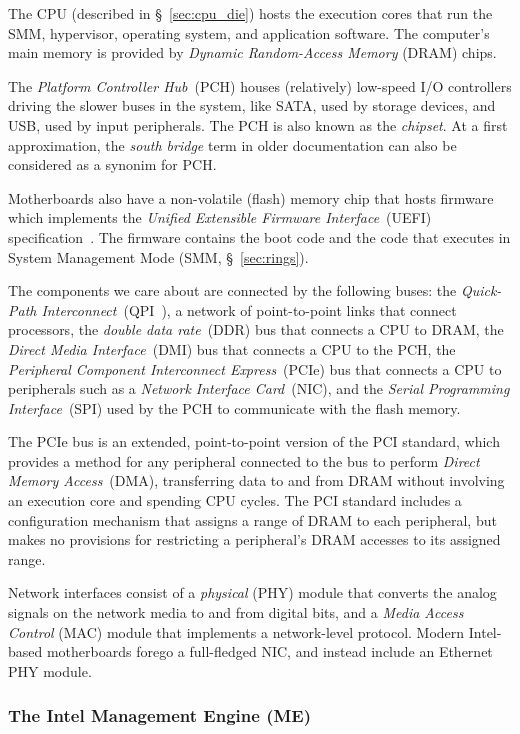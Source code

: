 The CPU (described in \S~\ref{sec:cpu_die}) hosts the execution cores that run
the SMM, hypervisor, operating system, and application software. The computer's
main memory is provided by \textit{Dynamic Random-Access Memory} (DRAM) chips.

The \textit{Platform Controller Hub}~(PCH) houses (relatively) low-speed I/O
controllers driving the slower buses in the system, like SATA, used by storage
devices, and USB, used by input peripherals. The PCH is also known as the
\textit{chipset}. At a first approximation, the \textit{south bridge} term in
older documentation can also be considered as a synonim for PCH.

Motherboards also have a non-volatile (flash) memory chip that hosts firmware
which implements the \textit{Unified Extensible Firmware Interface}~(UEFI)
specification~\cite{forum2015uefi}. The firmware contains the boot code and the
code that executes in System Management Mode (SMM, \S~\ref{sec:rings}).

The components we care about are connected by the following buses: the
\textit{Quick-Path Interconnect}~(QPI~\cite{intel2009qpi}), a network of
point-to-point links that connect processors, the
\textit{double data rate}~(DDR) bus that connects a CPU to DRAM, the
\textit{Direct Media Interface}~(DMI) bus that connects a CPU to the PCH, the
\textit{Peripheral Component Interconnect Express}~(PCIe) bus that connects
a CPU to peripherals such as a \textit{Network Interface Card}~(NIC), and the
\textit {Serial Programming Interface}~(SPI) used by the PCH to communicate
with the flash memory.

The PCIe bus is an extended, point-to-point version of the PCI standard, which
provides a method for any peripheral connected to the bus to perform
\textit{Direct Memory Access}~(DMA), transferring data to and from DRAM without
involving an execution core and spending CPU cycles. The PCI standard includes
a configuration mechanism that assigns a range of DRAM to each peripheral, but
makes no provisions for restricting a peripheral's DRAM accesses to its
assigned range.

Network interfaces consist of a \textit{physical} (PHY) module that converts
the analog signals on the network media to and from digital bits, and a
\textit{Media Access Control} (MAC) module that implements a network-level
protocol. Modern Intel-based motherboards forego a full-fledged NIC, and
instead include an Ethernet~\cite{ieee8023ethernet} PHY module.


\subsubsection{The Intel Management Engine (ME)}
\label{sec:intel_me}

